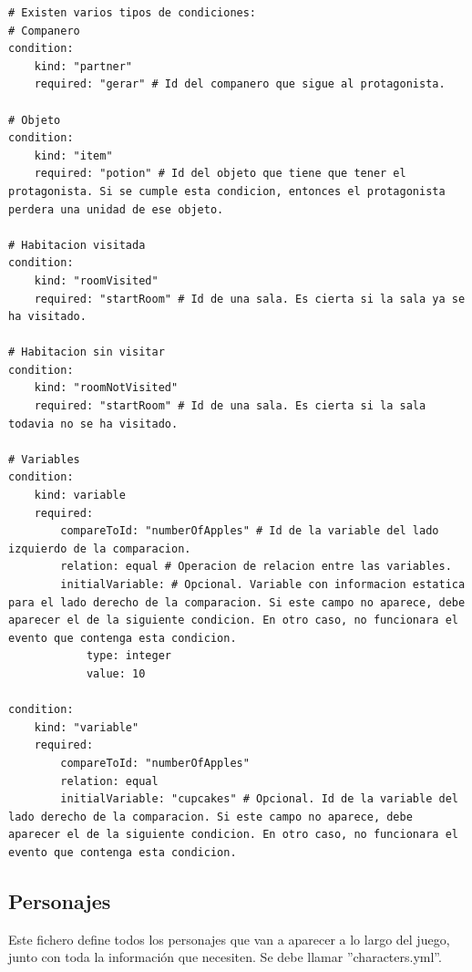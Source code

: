 \begin{lstlisting}
# Existen varios tipos de condiciones:
# Companero
condition:
	kind: "partner"
	required: "gerar" # Id del companero que sigue al protagonista.
	
# Objeto
condition:
	kind: "item"
	required: "potion" # Id del objeto que tiene que tener el protagonista. Si se cumple esta condicion, entonces el protagonista perdera una unidad de ese objeto.
	
# Habitacion visitada
condition:
	kind: "roomVisited"
	required: "startRoom" # Id de una sala. Es cierta si la sala ya se ha visitado.
	
# Habitacion sin visitar
condition:
	kind: "roomNotVisited"
	required: "startRoom" # Id de una sala. Es cierta si la sala todavia no se ha visitado.
	
# Variables
condition:
	kind: variable
	required:
		compareToId: "numberOfApples" # Id de la variable del lado izquierdo de la comparacion.
		relation: equal # Operacion de relacion entre las variables.
		initialVariable: # Opcional. Variable con informacion estatica para el lado derecho de la comparacion. Si este campo no aparece, debe aparecer el de la siguiente condicion. En otro caso, no funcionara el evento que contenga esta condicion.
			type: integer
			value: 10
		
condition:
	kind: "variable"
	required:
		compareToId: "numberOfApples"
		relation: equal
		initialVariable: "cupcakes" # Opcional. Id de la variable del lado derecho de la comparacion. Si este campo no aparece, debe aparecer el de la siguiente condicion. En otro caso, no funcionara el evento que contenga esta condicion.

\end{lstlisting}


\subsection{Personajes}
Este fichero define todos los personajes que van a aparecer a lo largo del juego, junto con toda la información que necesiten. Se debe llamar ''characters.yml''.

